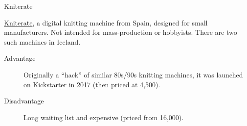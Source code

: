 \documentclass[
    NAME={Dr. Helga Ingimundardóttir},
    EMAIL={helgaingim@hi.is},
    FACULTY={Industrial Engineering},
    TITLE={HiDef Textiles: Reviving Tradition with Innovation},
    SUBTITLE={Empowering Creativity and Sustainability in Textile Production through Digital Transformation},
    SEMINAR={Reykjavík DataBeers},
    DATE={January 25, 2025},
    WIDE={true}
]{HI-LaTeX/hi-beamer}
\begin{document}
\begin{frame}{Kniterate}

    \href{https://www.kniterate.com/product/kniterate-the-digital-knitting-machine/}{Kniterate}, a digital knitting machine from Spain, designed for small manufacturers. Not intended for mass-production or hobbyists. There are two such machines in Iceland.

    \begin{description}
        \item[Advantage] Originally a ``hack'' of similar 80s/90s knitting machines, it was launched on \href{https://www.kickstarter.com/projects/kniterate/kniterate-the-digital-knitting-machine/}{Kickstarter} in 2017 (then priced at \texteuro{}4,500).
        \item[Disadvantage] Long waiting list and expensive (priced from \texteuro{}16,000).
    \end{description}


\end{frame}
\end{document}
